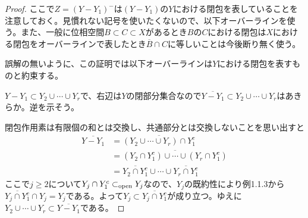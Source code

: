 \begin{proof}
  ここで$Z=(Y - Y_1)^{-}$は$(Y - Y_1)$の$Y$における閉包を表していることを注意しておく。見慣れない記号を使いたくないので、以下オーバーラインを使う。また、一般に位相空間$B \subset C \subset X$があるとき$B$の$C$における閉包は$X$における閉包をオーバーラインで表したとき$\overline{B} \cap C$に等しいことは今後断り無く使う。

  誤解の無いように、この証明では以下オーバーラインは$Y$における閉包を表すものと約束する。

  $Y - Y_1 \subset Y_2 \cup \cdots \cup Y_r$で、右辺は$Y$の閉部分集合なので$\overline{Y - Y_1} \subset Y_2 \cup \cdots \cup Y_r$はあきらか。逆を示そう。

  閉包作用素は有限個の和とは交換し、共通部分とは交換しないことを思い出すと
  \begin{align*}
    \overline{Y - Y_1} &= \overline{( Y_2 \cup \cdots \cup Y_r) \cap Y_1^c} \\
    &= \overline{( Y_2 \cap Y_1^c) \cup \cdots \cup (Y_r \cap Y_1^c)} \\
    &= \overline{Y_2 \cap Y_1^c} \cup \cdots \cup  \overline{Y_r \cap Y_1^c}
  \end{align*}
  ここで$j \geq 2$について$Y_j \cap Y_1^c \subset_{\text{open}} Y_j$なので、$Y_j$の既約性により例1.1.3から$\overline{Y_j \cap Y_1^c} \cap Y_j =Y_j$である。よって$Y_j \subset \overline{Y_j \cap Y_1^c}$が成り立つ。ゆえに$Y_2 \cup \cdots \cup Y_r \subset \overline{Y - Y_1}$である。
\end{proof}



